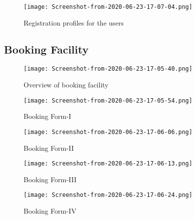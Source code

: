 \documentclass[12pt]{report}
\begin{document}
\begin{figure}[!htb]
  \centering
  \begin{minipage}[b]{0.4\textwidth}
    \texttt{[image: Screenshot-from-2020-06-23-17-07-04.png]}
    \caption{Registration profiles for the users}
  \end{minipage}
\end{figure}

\subsection{Booking Facility}

\begin{figure}[!htb]
  \centering
  \begin{minipage}[b]{0.4\textwidth}
    \texttt{[image: Screenshot-from-2020-06-23-17-05-40.png]}
    \caption{Overview of booking facility}
  \end{minipage}
  \hfill
  \begin{minipage}[b]{0.4\textwidth}
    \texttt{[image: Screenshot-from-2020-06-23-17-05-54.png]}
    \caption{Booking Form-I}
  \end{minipage}
\end{figure}
\newpage

\begin{figure}[!htb]
  \centering
  \begin{minipage}[b]{0.4\textwidth}
    \texttt{[image: Screenshot-from-2020-06-23-17-06-06.png]}
    \caption{Booking Form-II}
  \end{minipage}
  \hfill
  \begin{minipage}[b]{0.4\textwidth}
    \texttt{[image: Screenshot-from-2020-06-23-17-06-13.png]}
    \caption{Booking Form-III}
  \end{minipage}
\end{figure}

\begin{figure}[!htb]
  \centering
  \begin{minipage}[b]{0.4\textwidth}
    \texttt{[image: Screenshot-from-2020-06-23-17-06-24.png]}
    \caption{Booking Form-IV}
  \end{minipage}
\end{figure}
\newpage
\end{document}
